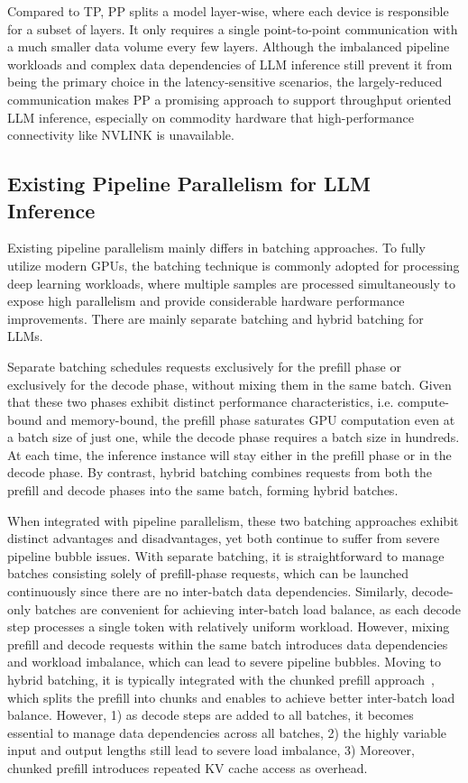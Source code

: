 Compared to TP, PP splits a model layer-wise, where each device is responsible for a subset of layers. 
It only requires a single point-to-point communication with a much smaller data volume every few layers.
Although the imbalanced pipeline workloads and complex data dependencies of LLM inference still prevent it from being the primary choice in the latency-sensitive scenarios,  the largely-reduced communication makes PP a promising approach to support throughput oriented LLM inference, especially on commodity hardware that high-performance connectivity like NVLINK is unavailable.

\subsection{Existing Pipeline Parallelism for LLM Inference}
\label{sec:batching}
Existing pipeline parallelism mainly differs in batching approaches.
To fully utilize modern GPUs, the batching technique is commonly adopted for processing deep learning workloads, where multiple samples are processed simultaneously to expose high parallelism and provide considerable hardware performance improvements.
There are mainly separate batching and hybrid batching for LLMs.

Separate batching schedules requests exclusively for the prefill phase or exclusively for the decode phase, without mixing them in the same batch. Given that these two phases exhibit distinct performance characteristics, i.e. compute-bound and memory-bound, the prefill phase saturates GPU computation even at a batch size of just one, while the decode phase requires a batch size in hundreds.
At each time, the inference instance will stay either in the prefill phase or in the decode phase.
By contrast, hybrid batching combines requests from both the prefill and decode phases into the same batch, forming hybrid batches.

When integrated with pipeline parallelism, these two batching approaches exhibit distinct advantages and disadvantages, yet both continue to suffer from severe pipeline bubble issues.
With separate batching, it is straightforward to manage batches consisting solely of prefill-phase requests, which can be launched continuously since there are no inter-batch data dependencies. Similarly, decode-only batches are convenient for achieving inter-batch load balance, as each decode step processes a single token with relatively uniform workload. However, mixing prefill and decode requests within the same batch introduces data dependencies and workload imbalance, which can lead to severe pipeline bubbles.
Moving to hybrid batching, it is typically integrated with the chunked prefill approach~\cite{agrawal2024taming}, which splits the prefill into chunks and enables to achieve better inter-batch load balance.
However, 1) as decode steps are added to all batches, it becomes essential to manage data dependencies across all batches, 2) the highly variable input and output lengths still lead to severe load imbalance, 3) Moreover, chunked prefill introduces repeated KV cache access as overhead.
